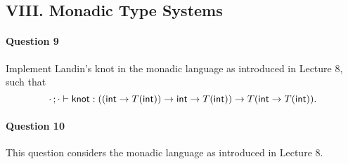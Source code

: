 \documentclass[11pt,a4paper,twoside]{article}
\begin{document}
\subsection*{VIII. Monadic Type Systems}

\paragraph{Question 9} Implement Landin's knot in the monadic language as introduced in Lecture 8,
such that  
  \[
    \cdot\, ; \cdot \vdash \mathsf{knot} : 
    ((\mathsf{int} \to T(\mathsf{int})) \to \mathsf{int} \to T(\mathsf{int})) \to T(\mathsf{int} \to T(\mathsf{int})).
  \]


\paragraph{Question 10} This question considers the monadic language as introduced in Lecture 8.
\end{document}
